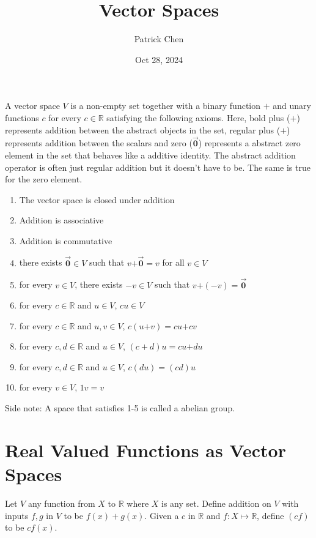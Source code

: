 \documentclass{article}
\title{Vector Spaces}
\author{Patrick Chen}
\date{Oct 28, 2024}
\theoremstyle{mytheoremstyle}
\theoremstyle{mytheoremstyle}
\theoremstyle{myproblemstyle}
\newcommand\z{\pmb{\vec{0}}}
\newcommand\p{\pmb{+}}
\begin{document}
    \maketitle
    A vector space $V$ is a non-empty set together with a binary function $+$
    and unary functions $c$ for every $c\in \mathbb{R}$ satisfying the following
    axioms. Here, bold plus ($\p$) represents addition between the abstract
    objects in the set, regular plus ($+$) represents addition between the
    scalars and zero ($\z$) represents a abstract zero element in the set that
    behaves like a additive identity. The abstract addition operator is often
    just regular addition but it doesn't have to be. The same is true for the
    zero element.

    \begin{enumerate}
        \item The vector space is closed under addition
        \item Addition is associative
        \item Addition is commutative
        \item there exists $\z \in V$ such that $v\p\z=v$ for all $v\in V$
        \item for every $v\in V$, there exists $-v\in V$ such that $v\p(-v)=\z$
        \item for every $c\in \mathbb{R}$ and $u\in V$, $cu\in V$
        \item for every $c\in \mathbb{R}$ and $u,v\in V$, $c(u\p v)=cu\p cv$
        \item for every $c,d\in \mathbb{R}$ and $u\in V$, $(c+d)u=cu\p du$
        \item for every $c,d\in \mathbb{R}$ and $u\in V$, $c(du)=(cd)u$
        \item for every $v\in V$, $1v=v$
    \end{enumerate}

    Side note: A space that satisfies 1-5 is called a abelian group.

    \section*{Real Valued Functions as Vector Spaces}
    Let $V$ any function from $X$ to $\mathbb{R}$ where $X$ is any set.
    Define addition on $V$ with inputs $f,g$ in $V$ to be $f(x)+g(x)$.
    Given a $c$ in $\mathbb{R}$ and $f: X \mapsto \mathbb{R}$, define $(cf)$
    to be $cf(x)$.
\end{document}
